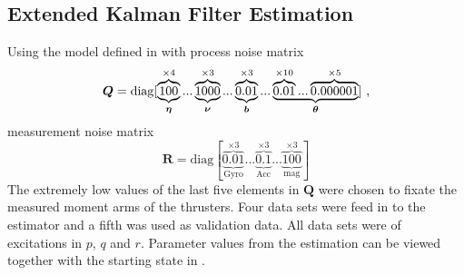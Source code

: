\subsection{Extended Kalman Filter Estimation}
Using the model defined in  with process noise matrix
\begin{equation*}
\boldsymbol{Q}=\text{diag}[\underbrace{\overbrace{100}^{\times4}}_{\boldsymbol{\eta}}... \underbrace{\overbrace{1000}^{\times3}}_{\boldsymbol{\nu}}...\underbrace{\overbrace{0.01}^{\times3}}_{\boldsymbol{b}}... \underbrace{\overbrace{0.01}^{\times10}... \overbrace{0.000001}^{\times5}}_{\boldsymbol{\theta}}]\text{ ,}
\end{equation*}
measurement noise matrix
\begin{equation*}
\boldsymbol{R} = \text{diag}[\underbrace{\overbrace{0.01}^{\times3}}_{\text{Gyro}}... \underbrace{\overbrace{0.1}^{\times3}}_{\text{Acc}}... \underbrace{\overbrace{100}^{\times3}}_{\text{mag}}]
\end{equation*}
The extremely low values of the last five elements in $\boldsymbol{Q}$ were chosen to fixate the measured moment arms of the thrusters. Four data sets were feed in to the estimator and a fifth was used as validation data. All data sets were of excitations in $p$, $q$ and $r$. Parameter values from the estimation can be viewed together with the starting state in .
